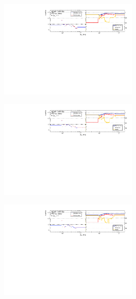 \begin{figure}[htb]
    \centering 
    \begin{subfigure}{.99\textwidth}\centering
      \includegraphics[width = 0.75\textwidth]{Figures/m4l/UnfoldingStudies/v014_inputs/m4l_y4l0-3inputs.pdf}
    \end{subfigure}
    \begin{subfigure}{.99\textwidth}\centering
      \includegraphics[width = 0.75\textwidth]{Figures/m4l/UnfoldingStudies/v014_inputs/m4l_y4l3-6inputs.pdf}
    \end{subfigure}
    \begin{subfigure}{.99\textwidth}\centering
      \includegraphics[width = 0.75\textwidth]{Figures/m4l/UnfoldingStudies/v014_inputs/m4l_y4l6-9inputs.pdf}

\end{subfigure}
\end{figure}
